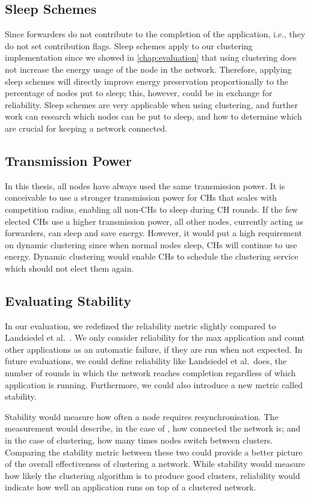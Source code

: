 \subsection{Sleep Schemes}
Since forwarders do not contribute to the completion of the application, i.e., they do not set contribution flags. Sleep schemes apply to our clustering implementation since we showed in \cref{chap:evaluation} that using clustering does not increase the energy usage of the node in the network. Therefore, applying sleep schemes will directly improve energy preservation proportionally to the percentage of nodes put to sleep; this, however, could be in exchange for reliability. Sleep schemes are very applicable when using clustering, and further work can research which nodes can be put to sleep, and how to determine which are crucial for keeping a network connected.

\subsection{Transmission Power}
In this thesis, all nodes have always used the same transmission power. It is conceivable to use a stronger transmission power for CHs that scales with competition radius, enabling all non-CHs to sleep during CH rounds. If the few elected CHs use a higher transmission power, all other nodes, currently acting as forwarders, can sleep and save energy. However, it would put a high requirement on dynamic clustering since when normal nodes sleep, CHs will continue to use energy. Dynamic clustering would enable CHs to schedule the clustering service which should not elect them again.


\subsection{Evaluating Stability}
In our evaluation, we redefined the reliability metric slightly compared to Landsiedel et al.~\cite{chaos-introduction-paper}. We only consider reliability for the max application and count other applications as an automatic failure, if they are run when not expected. In future evaluations, we could define reliability like Landsiedel et al.~does, the number of rounds in which the network reaches completion regardless of which application is running. Furthermore, we could also introduce a new metric called stability.

Stability would measure how often a node requires resynchronisation. The measurement would describe, in the case of \atwo{}, how connected the network is; and in the case of clustering, how many times nodes switch between clusters. Comparing the stability metric between these two could provide a better picture of the overall effectiveness of clustering a network. While stability would measure how likely the clustering algorithm is to produce good clusters, reliability would indicate how well an application runs on top of a clustered network.

